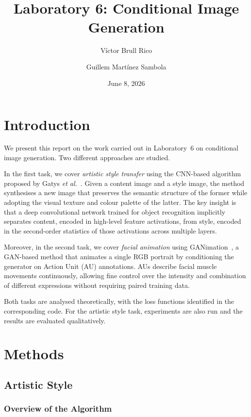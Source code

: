 \documentclass{article}
\title{Laboratory 6: Conditional Image Generation}
\author{Víctor Brull Rico \and Guillem Martínez Sambola}
\date{June 8, 2026}
\begin{document}
\maketitle

\section{Introduction}

We present this report on the work carried out in Laboratory~6 on conditional image
generation. Two different approaches are studied.

In the first task, we cover \textit{artistic style transfer} using the CNN-based
algorithm proposed by Gatys \textit{et al.}~\cite{gatys2015neural}. Given a
content image and a style image, the method synthesises a new image that
preserves the semantic structure of the former while adopting the visual
texture and colour palette of the latter. The key insight is that a deep
convolutional network trained for object recognition implicitly separates
content, encoded in high-level feature activations, from style, encoded in
the second-order statistics of those activations across multiple layers.

Moreover, in the second task, we cover \textit{facial animation} using
GANimation~\cite{pumarola2020ganimation}, a GAN-based method that animates a
single RGB portrait by conditioning the generator on Action Unit (AU)
annotations. AUs describe facial muscle movements continuously, allowing fine
control over the intensity and combination of different expressions without
requiring paired training data.

Both tasks are analysed theoretically, with the loss functions identified in
the corresponding code. For the artistic style task, experiments are also
run and the results are evaluated qualitatively.

\section{Methods}
\label{sec:Methods}

\subsection{Artistic Style}

\subsubsection{Overview of the Algorithm}
\end{document}
